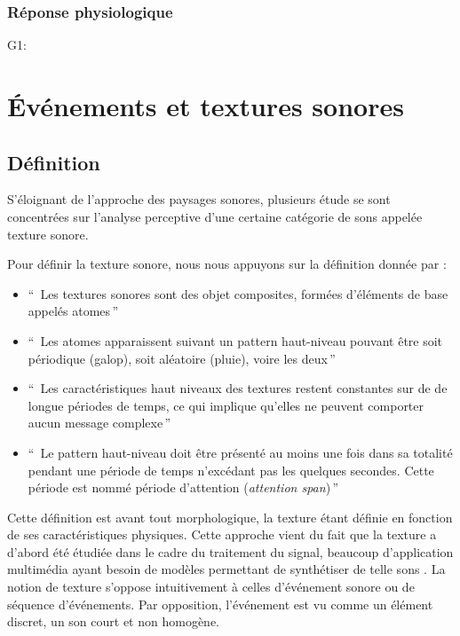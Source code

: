 \subsubsection{Réponse physiologique}

G1: \citep{hume2013physiological}

\section{Événements et textures sonores}

\subsection{Définition}

S'éloignant de l'approche des paysages sonores, plusieurs étude se sont concentrées sur l'analyse perceptive d'une certaine catégorie de sons appelée texture sonore.

Pour définir la texture sonore, nous nous appuyons sur la définition donnée par \citep[p. 25]{saint1995classification}:  

\begin{itemize}
\item ``\, Les textures sonores sont des objet composites, formées d'éléments de base appelés atomes\,''
\item ``\, Les atomes apparaissent suivant un pattern haut-niveau pouvant être soit périodique (galop), soit aléatoire (pluie), voire les deux\,''
\item ``\, Les caractéristiques haut niveaux des textures restent constantes sur de de longue périodes de temps, ce qui implique qu'elles ne peuvent comporter aucun message complexe\,''
\item ``\, Le pattern haut-niveau doit être présenté au moins une fois dans sa totalité pendant une période de temps n’excédant pas les quelques  secondes. Cette période est nommé période d'attention (\emph{attention span})\,''
\end{itemize}

Cette définition est avant tout morphologique, la texture étant définie en fonction de ses caractéristiques physiques. Cette approche vient du fait que la texture a d'abord été étudiée dans le cadre du traitement du signal, beaucoup d'application multimédia ayant besoin de  modèles permettant de synthétiser de telle sons \citep{schwarz2011state}. La notion de texture s'oppose intuitivement à celles d'événement sonore ou de séquence d'événements. Par opposition, l'événement est vu comme un élément discret, un son court et non homogène.

